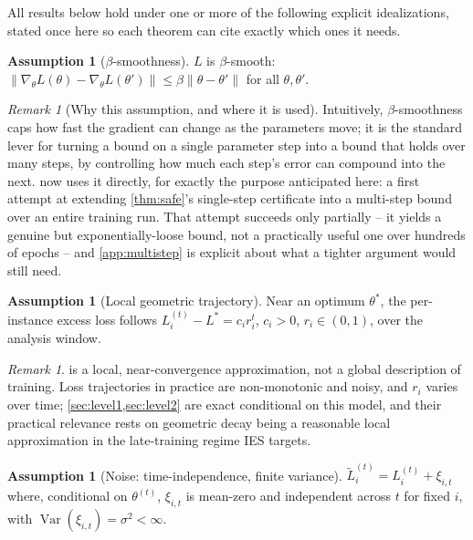 \documentclass{article}
\theoremstyle{plain}
\theoremstyle{definition}
\newtheorem{assumption}[theorem]{Assumption}
\theoremstyle{remark}
\newtheorem{remark}[theorem]{Remark}
\DeclareMathOperator{\Var}{Var}
\begin{document}
All results below hold under one or more of the following explicit idealizations, stated once here so each theorem can cite exactly which ones it needs.

\begin{assumption}[$\beta$-smoothness]
\label{ass:smooth}
$L$ is $\beta$-smooth: $\|\nabla_\theta L(\theta) - \nabla_\theta L(\theta')\| \le \beta\|\theta-\theta'\|$ for all $\theta,\theta'$.
\end{assumption}

\begin{remark}[Why this assumption, and where it is used]
\label{rem:smooth-why}
Intuitively, $\beta$-smoothness caps how fast the gradient can change as the parameters move; it is the standard lever for turning a bound on a single parameter step into a bound that holds over many steps, by controlling how much each step's error can compound into the next.  now uses it directly, for exactly the purpose anticipated here: a first attempt at extending \cref{thm:safe}'s single-step certificate into a multi-step bound over an entire training run. That attempt succeeds only partially -- it yields a genuine but exponentially-loose bound, not a practically useful one over hundreds of epochs -- and \cref{app:multistep} is explicit about what a tighter argument would still need.
\end{remark}

\begin{assumption}[Local geometric trajectory]
\label{ass:geometric}
Near an optimum $\theta^*$, the per-instance excess loss follows $L_i^{(t)} - L^* = c_i r_i^t$, $c_i>0$, $r_i \in (0,1)$, over the analysis window.
\end{assumption}

\begin{remark}
\label{rem:geometric-scope}
 is a local, near-convergence approximation, not a global description of training. Loss trajectories in practice are non-monotonic and noisy, and $r_i$ varies over time; \cref{sec:level1,sec:level2} are exact conditional on this model, and their practical relevance rests on geometric decay being a reasonable local approximation in the late-training regime IES targets.
\end{remark}

\begin{assumption}[Noise: time-independence, finite variance]
\label{ass:noise}
$\tilde L_i^{(t)} = L_i^{(t)} + \xi_{i,t}$ where, conditional on $\theta^{(t)}$, $\xi_{i,t}$ is mean-zero and independent across $t$ for fixed $i$, with $\Var(\xi_{i,t}) = \sigma^2 < \infty$.
\end{assumption}
\end{document}
